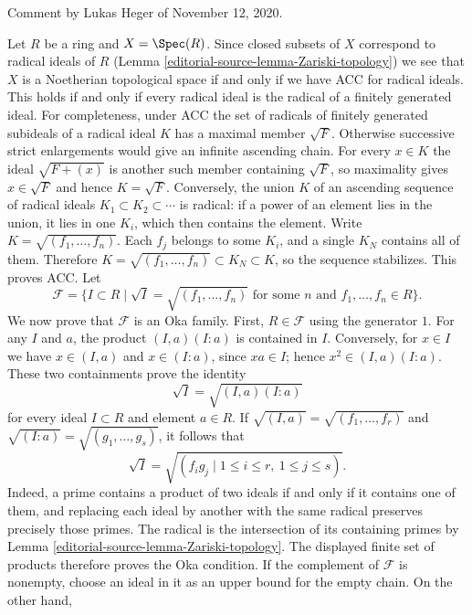 \begin{example}
\label{editorial-source-example-noetherian-topology-on-spec}
\begin{reference}
Comment by Lukas Heger of November 12, 2020.
\end{reference}
Let $R$ be a ring and $X = \Spec(R)$. Since closed subsets of $X$ correspond to
radical ideals of $R$ (Lemma \ref{editorial-source-lemma-Zariski-topology}) we see that $X$ is a
Noetherian topological space if and only if we have ACC for radical ideals.
This holds if and only if every radical ideal is the radical of a finitely
generated ideal. For completeness, under ACC the set of radicals
of finitely generated subideals of a radical ideal $K$ has a maximal
member $\sqrt{F}$. Otherwise successive strict enlargements would
give an infinite ascending chain. For every $x\in K$ the ideal
$\sqrt{F+(x)}$ is another such member containing $\sqrt F$,
so maximality gives $x\in\sqrt F$ and hence $K=\sqrt F$.
Conversely, the union $K$ of an ascending sequence of radical ideals
$K_1\subset K_2\subset\cdots$ is radical: if a power of an element
lies in the union, it lies in one $K_i$, which then contains the element.
Write $K=\sqrt{(f_1,\ldots,f_n)}$. Each $f_j$ belongs to some
$K_i$, and a single $K_N$ contains all of them. Therefore
$K=\sqrt{(f_1,\ldots,f_n)}\subset K_N\subset K$, so the sequence
stabilizes. This proves ACC. Let
$$
\mathcal{F} = \{I \subset R \mid
\sqrt{I} = \sqrt{(f_1, \ldots, f_n)}\text{ for some }n
\text{ and }f_1, \ldots, f_n \in R\}.
$$
We now prove that $\mathcal F$ is an Oka family. First, $R\in\mathcal F$
using the generator $1$. For any $I$ and $a$, the product
$(I,a)(I:a)$ is contained in $I$. Conversely, for $x\in I$ we have
$x\in(I,a)$ and $x\in(I:a)$, since $xa\in I$; hence
$x^2\in(I,a)(I:a)$. These two containments prove the identity
$$
\sqrt{I} = \sqrt{(I, a)(I : a)}
$$
for every ideal $I\subset R$ and element $a\in R$.
If $\sqrt{(I,a)}=\sqrt{(f_1,\ldots,f_r)}$ and
$\sqrt{(I:a)}=\sqrt{(g_1,\ldots,g_s)}$, it follows that
$$
\sqrt I=\sqrt{(f_i g_j\mid 1\leq i\leq r,\ 1\leq j\leq s)}.
$$
Indeed, a prime contains a product of two ideals if and only if it
contains one of them, and replacing each ideal by another with the
same radical preserves precisely those primes. The radical is the
intersection of its containing primes by Lemma \ref{editorial-source-lemma-Zariski-topology}.
The displayed finite set of products therefore proves the Oka condition.
If the complement of $\mathcal F$ is nonempty, choose an ideal
in it as an upper bound for the empty chain. On the other hand,

\end{example}
